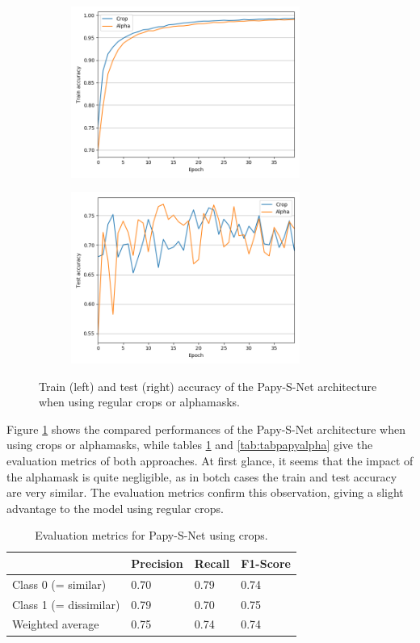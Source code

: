 \documentclass[11pt]{report}
\begin{document}
\begin{figure}[h!]
\centering
  \begin{subfigure}{8cm}
    \centering\includegraphics[width=7.5cm]{plot_train_cropalpha.png}
  \end{subfigure}
  \begin{subfigure}{8cm}
    \centering\includegraphics[width=7.5cm]{plot_test_cropalpha.png}
  \end{subfigure}
\caption{Train (left) and test (right) accuracy of the Papy-S-Net architecture when using regular crops or alphamasks.}
\label{alphavscrop}
\end{figure}

Figure \ref{alphavscrop} shows the compared performances of the Papy-S-Net architecture when using crops or alphamasks, while tables \ref{tab:tabpapycrop} and \ref{tab:tabpapyalpha} give the evaluation metrics of both approaches. At first glance, it seems that the impact of the alphamask is quite negligible, as in botch cases the train and test accuracy are very similar. The evaluation metrics confirm this observation, giving a slight advantage to the model using regular crops.\newline

\begin{table}[h!]
\begin{tabular}{l|l|l|l|}
\cline{2-4}
                                             & Precision & Recall & F1-Score \\ \hline
\multicolumn{1}{|l|}{Class 0 (= similar)}    & 0.70      & 0.79   & 0.74     \\ \cline{1-1}
\multicolumn{1}{|l|}{Class 1 (= dissimilar)} & 0.79      & 0.70   & 0.75     \\ \hline
\multicolumn{1}{|l|}{Weighted average}       & 0.75      & 0.74   & 0.74     \\ \hline
\end{tabular}
\caption{Evaluation metrics for Papy-S-Net using crops.}
\label{tab:tabpapycrop}
\end{table}
\end{document}
